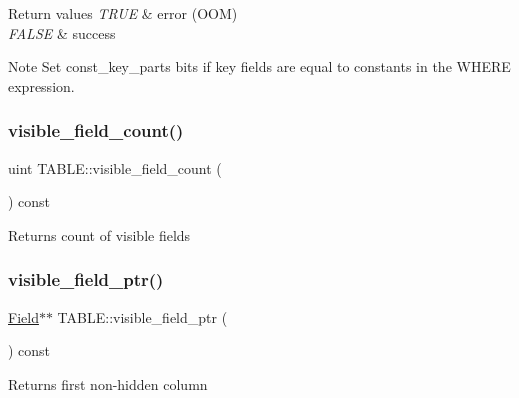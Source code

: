 \begin{DoxyRetVals}{Return values}
{\em T\+R\+UE} & error (O\+OM) \\
\hline
{\em F\+A\+L\+SE} & success\\
\hline
\end{DoxyRetVals}
\begin{DoxyNote}{Note}
Set const\+\_\+key\+\_\+parts bits if key fields are equal to constants in the W\+H\+E\+RE expression. 
\end{DoxyNote}
\mbox{\label{structTABLE_a844377a21852fe7925a6a7248fc2bce4}} 
\subsubsection{\texorpdfstring{visible\+\_\+field\+\_\+count()}{visible\_field\_count()}}
{\footnotesize\ttfamily uint T\+A\+B\+L\+E\+::visible\+\_\+field\+\_\+count (\begin{DoxyParamCaption}{ }\end{DoxyParamCaption}) const\hspace{0.3cm}{\ttfamily [inline]}}

\begin{DoxyReturn}{Returns}
count of visible fields 
\end{DoxyReturn}
\mbox{\label{structTABLE_a81f6a41f3ec445d4b029f067b90d1ddd}} 
\subsubsection{\texorpdfstring{visible\+\_\+field\+\_\+ptr()}{visible\_field\_ptr()}}
{\footnotesize\ttfamily \mbox{\hyperlink{classField}{Field}}$\ast$$\ast$ T\+A\+B\+L\+E\+::visible\+\_\+field\+\_\+ptr (\begin{DoxyParamCaption}{ }\end{DoxyParamCaption}) const\hspace{0.3cm}{\ttfamily [inline]}}

\begin{DoxyReturn}{Returns}
first non-\/hidden column 
\end{DoxyReturn}



